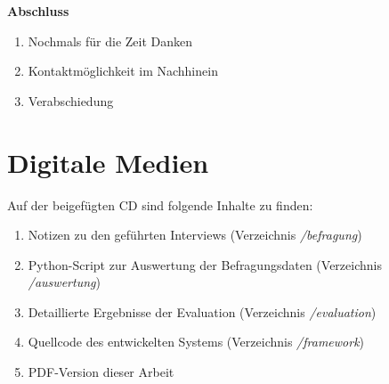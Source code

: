 \textbf{\large Abschluss}

\begin{enumerate}[noitemsep,topsep=0pt]
    \item Nochmals für die Zeit Danken
    \item Kontaktmöglichkeit im Nachhinein
    \item Verabschiedung
\end{enumerate}

\chapter{Digitale Medien} \label{appendix:cd}

Auf der beigefügten CD sind folgende Inhalte zu finden:
\begin{enumerate}[noitemsep,topsep=0pt]
    \item Notizen zu den geführten Interviews (Verzeichnis \textit{/befragung})
    \item Python-Script zur Auswertung der Befragungsdaten (Verzeichnis \textit{/auswertung})
    \item Detaillierte Ergebnisse der Evaluation (Verzeichnis \textit{/evaluation})
    \item Quellcode des entwickelten Systems (Verzeichnis \textit{/framework})
    \item PDF-Version dieser Arbeit
\end{enumerate}

